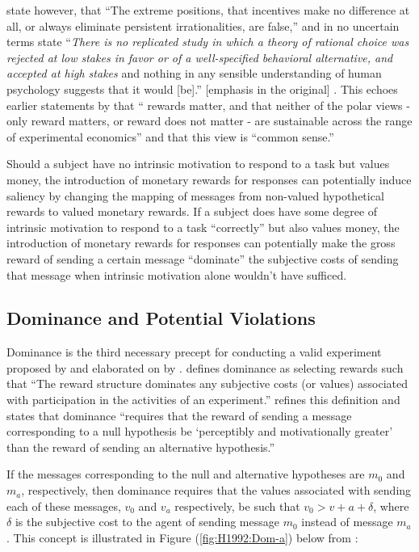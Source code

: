 \documentclass[../main.tex]{subfiles}
\begin{document}
\textcite[8]{Camerer1999} state however, that \enquote{The extreme positions, that  incentives make no difference at all, or always eliminate persistent irrationalities, are false,} and in no uncertain terms state \enquote{\textit{There is no replicated study in which a theory of rational choice was rejected at low stakes in favor or of a well-specified behavioral alternative, and accepted at high stakes} \textelp{} and nothing in any sensible understanding of human psychology suggests that it would [be].} [emphasis in the original] \parencite*[33-34]{Camerer1999}.
This echoes earlier statements by \textcite[246]{Smith1993} that \enquote{\textelp{} rewards matter, and that neither of the polar views - only reward matters, or reward does not matter - are sustainable across the range of experimental economics} and that this view is \enquote{common sense.}

Should a subject have no intrinsic motivation to respond to a task but values money, the introduction of monetary rewards for responses can potentially induce saliency by changing the mapping of messages from non-valued hypothetical rewards to valued monetary rewards.
If a subject does have some degree of intrinsic motivation to respond to a task \enquote{correctly} but also values money, the introduction of monetary rewards for responses can potentially make the gross reward of sending a certain message \enquote{dominate} the subjective costs of sending that message when intrinsic motivation alone wouldn't have sufficed.

\singlespacing
\subsection{Dominance and Potential Violations}
\doublespacing

Dominance is the third necessary precept for conducting a valid experiment proposed by \textcite{Smith1982} and elaborated on by \textcite{Harrison1989, Harrison1992}.
\textcite[934]{Smith1982} defines dominance as selecting rewards such that \enquote{The reward structure dominates any subjective costs (or values) associated with participation in the activities of an experiment.}
\textcite[1426]{Harrison1992} refines this definition and states that dominance \enquote{requires that the reward of sending a message corresponding to a null hypothesis be \enquote{perceptibly and motivationally greater} than the reward of sending an alternative hypothesis.}

If the messages corresponding to the null and alternative hypotheses are $m_0$ and $m_a$, respectively, then dominance requires that the values associated with sending each of these messages, $v_0$ and $v_a$ respectively, be such that $v_0 > v+a + \delta$, where $\delta$ is the subjective cost to the agent of sending message $m_0$ instead of message $m_a$ \parencite[1427]{Harrison1992}.
This concept is illustrated in Figure (\ref{fig:H1992:Dom-a}) below from \textcite[1427]{Harrison1992}:
\end{document}
